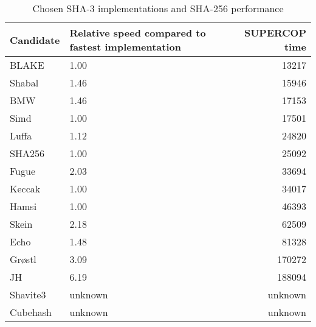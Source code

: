 \begin{table}
  \centering
  \caption{Chosen \ac{SHA}-3 implementations and SHA-256 performance}
  \begin{tabular}{ | l | p{6cm} | r | }
    \hline
    \textbf{Candidate} & \textbf{Relative speed compared to fastest implementation} & \textbf{SUPERCOP time} \\ \hline
     BLAKE      & 1.00              & 13217         \\ \hline
     Shabal     & 1.46              & 15946         \\ \hline
     \ac{BMW}   & 1.46              & 17153         \\ \hline
     Simd       & 1.00              & 17501         \\ \hline
     Luffa      & 1.12              & 24820         \\ \hline
     SHA256     & 1.00              & 25092         \\ \hline
     Fugue      & 2.03              & 33694         \\ \hline
     Keccak     & 1.00              & 34017         \\ \hline
     Hamsi      & 1.00              & 46393         \\ \hline
     Skein      & 2.18              & 62509         \\ \hline
     Echo       & 1.48              & 81328         \\ \hline
     Grøstl    & 3.09              & 170272        \\ \hline
     JH         & 6.19              & 188094        \\ \hline
     Shavite3   & unknown           & unknown       \\ \hline
     Cubehash   & unknown           & unknown       \\ \hline
  \end{tabular}
  \label{tbl:sha3:speedrelative}
\end{table}
